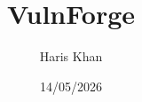 \usepackage{lipsum}          %
\usepackage{enumitem}        %
\usepackage{verbatim}        %
\usepackage{afterpage}       %


\usepackage{titlesec}
\titleformat{\subsubsection}[runin]{\normalfont\bfseries}{\thesubsubsection}{1em}{}

\title{VulnForge}
\author{Haris Khan}


\date{14/05/2026}




\frontmatter


